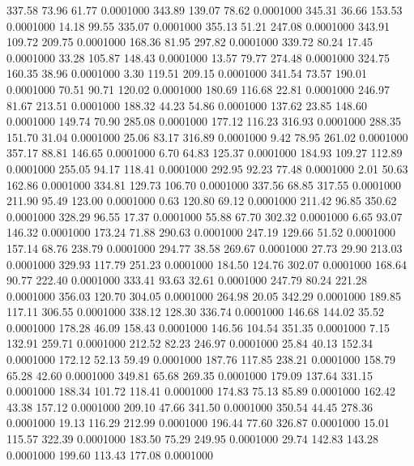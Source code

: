  337.58   73.96   61.77   0.0001000
 343.89  139.07   78.62   0.0001000
 345.31   36.66  153.53   0.0001000
  14.18   99.55  335.07   0.0001000
 355.13   51.21  247.08   0.0001000
 343.91  109.72  209.75   0.0001000
 168.36   81.95  297.82   0.0001000
 339.72   80.24   17.45   0.0001000
  33.28  105.87  148.43   0.0001000
  13.57   79.77  274.48   0.0001000
 324.75  160.35   38.96   0.0001000
   3.30  119.51  209.15   0.0001000
 341.54   73.57  190.01   0.0001000
  70.51   90.71  120.02   0.0001000
 180.69  116.68   22.81   0.0001000
 246.97   81.67  213.51   0.0001000
 188.32   44.23   54.86   0.0001000
 137.62   23.85  148.60   0.0001000
 149.74   70.90  285.08   0.0001000
 177.12  116.23  316.93   0.0001000
 288.35  151.70   31.04   0.0001000
  25.06   83.17  316.89   0.0001000
   9.42   78.95  261.02   0.0001000
 357.17   88.81  146.65   0.0001000
   6.70   64.83  125.37   0.0001000
 184.93  109.27  112.89   0.0001000
 255.05   94.17  118.41   0.0001000
 292.95   92.23   77.48   0.0001000
   2.01   50.63  162.86   0.0001000
 334.81  129.73  106.70   0.0001000
 337.56   68.85  317.55   0.0001000
 211.90   95.49  123.00   0.0001000
   0.63  120.80   69.12   0.0001000
 211.42   96.85  350.62   0.0001000
 328.29   96.55   17.37   0.0001000
  55.88   67.70  302.32   0.0001000
   6.65   93.07  146.32   0.0001000
 173.24   71.88  290.63   0.0001000
 247.19  129.66   51.52   0.0001000
 157.14   68.76  238.79   0.0001000
 294.77   38.58  269.67   0.0001000
  27.73   29.90  213.03   0.0001000
 329.93  117.79  251.23   0.0001000
 184.50  124.76  302.07   0.0001000
 168.64   90.77  222.40   0.0001000
 333.41   93.63   32.61   0.0001000
 247.79   80.24  221.28   0.0001000
 356.03  120.70  304.05   0.0001000
 264.98   20.05  342.29   0.0001000
 189.85  117.11  306.55   0.0001000
 338.12  128.30  336.74   0.0001000
 146.68  144.02   35.52   0.0001000
 178.28   46.09  158.43   0.0001000
 146.56  104.54  351.35   0.0001000
   7.15  132.91  259.71   0.0001000
 212.52   82.23  246.97   0.0001000
  25.84   40.13  152.34   0.0001000
 172.12   52.13   59.49   0.0001000
 187.76  117.85  238.21   0.0001000
 158.79   65.28   42.60   0.0001000
 349.81   65.68  269.35   0.0001000
 179.09  137.64  331.15   0.0001000
 188.34  101.72  118.41   0.0001000
 174.83   75.13   85.89   0.0001000
 162.42   43.38  157.12   0.0001000
 209.10   47.66  341.50   0.0001000
 350.54   44.45  278.36   0.0001000
  19.13  116.29  212.99   0.0001000
 196.44   77.60  326.87   0.0001000
  15.01  115.57  322.39   0.0001000
 183.50   75.29  249.95   0.0001000
  29.74  142.83  143.28   0.0001000
 199.60  113.43  177.08   0.0001000
